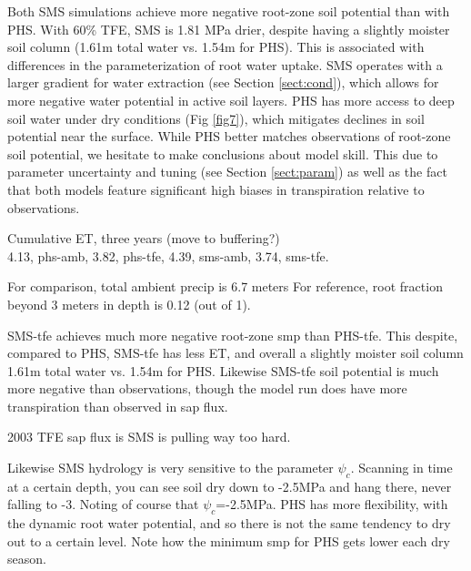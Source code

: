\documentclass[draft,linenumbers]{agujournal}
\begin{document}
Both SMS simulations achieve more negative root-zone soil potential than with PHS.
With 60\% TFE, SMS is 1.81 MPa drier, despite having a slightly moister soil column (1.61m total water vs. 1.54m for PHS).
This is associated with differences in the parameterization of root water uptake.
SMS operates with a larger gradient for water extraction (see Section \ref{sect:cond}), which allows for more negative water potential in active soil layers.
PHS has more access to deep soil water under dry conditions (Fig \ref{fig7}), which mitigates declines in soil potential near the surface.
While PHS better matches observations of root-zone soil potential, we hesitate to make conclusions about model skill.
This due to parameter uncertainty and tuning (see Section \ref{sect:param}) as well as the fact that both models feature significant high biases in transpiration relative to observations.

Cumulative ET, three years (move to buffering?) \\
    4.13, phs-amb,
    3.82, phs-tfe,
    4.39, sms-amb,
    3.74, sms-tfe.

For comparison, total ambient precip is 6.7 meters
For reference, root fraction beyond 3 meters in depth is 0.12 (out of 1).


SMS-tfe achieves much more negative root-zone smp than PHS-tfe.
This despite, compared to PHS, SMS-tfe has less ET, and overall a slightly moister soil column 1.61m total water vs. 1.54m for PHS.
Likewise SMS-tfe soil potential is much more negative than observations, though the model run does have more transpiration than observed in sap flux.

2003 TFE sap flux is 
SMS is pulling way too hard.

Likewise SMS hydrology is very sensitive to the parameter $\psi_c$. 
Scanning in time at a certain depth, you can see soil dry down to -2.5MPa and hang there, never falling to -3.
Noting of course that $\psi_c$=-2.5MPa.
PHS has more flexibility, with the dynamic root water potential, and so there is not the same tendency to dry out to a certain level.
Note how the minimum smp for PHS gets lower each dry season.
\end{document}
